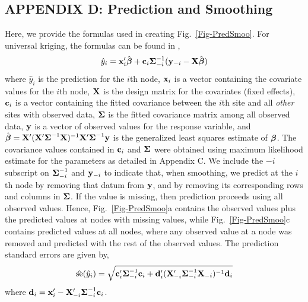 \documentclass[11pt, titlepage]{article}\usepackage[]{graphicx}\usepackage[]{color}
\begin{document}
\begin{spacing}{1.9}
\begin{flushleft}

\clearpage
\setcounter{equation}{0}
\renewcommand{\theequation}{D.\arabic{equation}}
\setcounter{figure}{0}
\renewcommand{\thefigure}{D.\arabic{figure}}
\section{APPENDIX D: Prediction and Smoothing}

Here, we provide the formulas used in creating Fig.~\ref{Fig-PredSmoo}.  For universal kriging, the formulas can be found in \citet[][p. 148]{Cres:Wikl:stat:2011},
\[
				\hat{y}_i = \mathbf{x}_i^{\prime}\hat{\mbox{\boldmath $\beta$}} + \mathbf{c}_i\mbox{\boldmath $\Sigma$}^{-1}_{-i}(\mathbf{y}_{-i} - \mathbf{X}\hat{\mbox{\boldmath $\beta$}})
\]
where $\hat{y}_i$ is the prediction for the $i$th node, $\mathbf{x}_i$ is a vector containing the covariate values for the $i$th node, $\mathbf{X}$ is the design matrix for the covariates (fixed effects), $\mathbf{c}_i$ is a vector containing the fitted covariance between the $i$th site and all \emph{other} sites with observed data, $\mbox{\boldmath $\Sigma$}$ is the fitted covariance matrix among all observed data, $\mathbf{y}$ is a vector of observed values for the response variable, and $\hat{\mbox{\boldmath $\beta$}} = \mathbf{X}^{\prime}(\mathbf{X}^{\prime}\mbox{\boldmath $\Sigma$}^{-1}\mathbf{X})^{-1}\mathbf{X}^{\prime}\mbox{\boldmath $\Sigma$}^{-1}\mathbf{y}$ is the generalized least squares estimate of $\mbox{\boldmath $\beta$}$.  The covariance values contained in $\mathbf{c}_i$ and $\mbox{\boldmath $\Sigma$}$ were obtained using maximum likelihood estimate for the parameters as detailed in Appendix C.  We include the $-i$ subscript on $\mbox{\boldmath $\Sigma$}^{-1}_{-i}$ and $\mathbf{y}_{-i}$ to indicate that, when smoothing, we predict at the $i$th node by removing that datum from $\mathbf{y}$, and by removing its corresponding rows and columns in $\mbox{\boldmath $\Sigma$}$.  If the value is missing, then prediction proceeds using all observed values.  Hence, Fig.~\ref{Fig-PredSmoo}a contains the observed values plus the predicted values at nodes with missing values, while Fig.~\ref{Fig-PredSmoo}c contains predicted values at all nodes, where any observed value at a node was removed and predicted with the rest of the observed values.  The prediction standard errors are given by,
\[
	\hat{\textrm{se}}(\hat{y}_i) = \sqrt{\mathbf{c}_i^{\prime}\mbox{\boldmath $\Sigma$}^{-1}_{-i}\mathbf{c}_i + 
	  \mathbf{d}_i^{\prime}(\mathbf{X}_{-i}^{\prime}\mbox{\boldmath $\Sigma$}^{-1}_{-i}\mathbf{X}_{-i})^{-1} \mathbf{d}_i}
\]
where $\mathbf{d}_i = \mathbf{x}_i^{\prime} - \mathbf{X}_{-i}^{\prime}\mbox{\boldmath $\Sigma$}^{-1}_{-i}\mathbf{c}_i$.


\end{flushleft}
\end{spacing}
\end{document}
